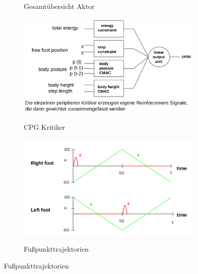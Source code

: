 \begin{figure}
\begin{subfigure}{.5\textwidth}
		\label{ch:09:fig:gesamtuebersicht-aktor}
		\caption{Gesamtübersicht Aktor}
	\end{subfigure}
	\begin{subfigure}{.5\textwidth}
		\centering
		\includegraphics[width=\textwidth]{figures/cpg_kritiker.png}
		\label{ch:09:fig:cpg-kritiker}
		\caption{CPG Kritiker}
	\end{subfigure}
	\begin{subfigure}{.5\textwidth}
		\centering
		\includegraphics[width=\textwidth]{figures/fusspunkttrajektorien.png}
		\label{ch:09:fig:fusspunkttrajektorien}
		\caption{Fußpunkttrajektorien}
	\end{subfigure}
\end{figure}


